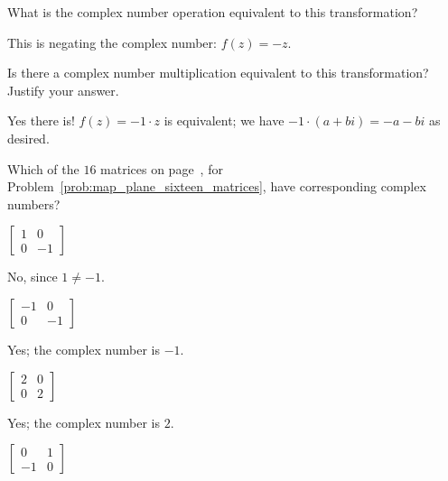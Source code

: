 \documentclass[../key.tex]{subfiles}
\begin{document}
\begin{inner_problem}
\item What is the complex number operation equivalent to this transformation?
\end{inner_problem}

This is negating the complex number: $f(z) = -z$.

\begin{inner_problem}
\item Is there a complex number multiplication equivalent to this transformation? Justify your answer.
\end{inner_problem}

Yes there is! $f(z) = -1\cdot z$ is equivalent; we have $-1 \cdot (a+bi) = -a-bi$ as desired.

\begin{outer_problem}
\item
\end{outer_problem}

\newcommand{\mtrxtbt}[4] {$\left[\begin{array}{cc}#1 & #2 \\ #3 & #4 \end{array}\right]$}

\begin{inner_problem}[start=1]
\item Which of the $16$ matrices on page~\pageref{prob:map_plane_sixteen_matrices}, for Problem~\ref{prob:map_plane_sixteen_matrices}, have corresponding complex numbers?
\end{inner_problem}

\begin{iinner_problem}[start=1]
\item \mtrxtbt{1}{0}{0}{-1}
\end{iinner_problem}

No, since $1\neq -1$.

\begin{iinner_problem}
\item \mtrxtbt{-1}{0}{0}{-1}
\end{iinner_problem}

Yes; the complex number is $-1$.

\begin{iinner_problem}
\item \mtrxtbt{2}{0}{0}{2}
\end{iinner_problem}

Yes; the complex number is $2$.

\begin{iinner_problem}
\item \mtrxtbt{0}{1}{-1}{0}
\end{iinner_problem}
\end{document}
